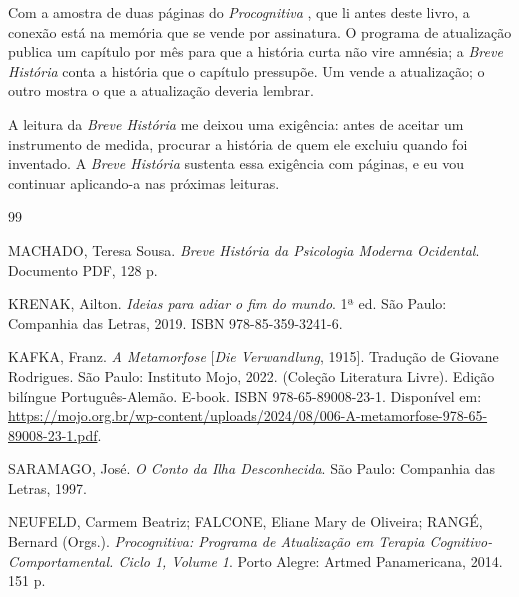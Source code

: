 \documentclass[12pt]{article}
\begin{document}
Com a amostra de duas páginas do \emph{Procognitiva} \cite{procognitiva2014}, que li antes deste livro, a conexão está na memória que se vende por assinatura. O programa de atualização publica um capítulo por mês para que a história curta não vire amnésia; a \emph{Breve História} conta a história que o capítulo pressupõe. Um vende a atualização; o outro mostra o que a atualização deveria lembrar.

A leitura da \emph{Breve História} me deixou uma exigência: antes de aceitar um instrumento de medida, procurar a história de quem ele excluiu quando foi inventado. A \emph{Breve História} sustenta essa exigência com páginas, e eu vou continuar aplicando-a nas próximas leituras.

\begin{thebibliography}{99}

MACHADO, Teresa Sousa.
\emph{Breve História da Psicologia Moderna Ocidental}.
Documento PDF, 128 p.

KRENAK, Ailton.
\emph{Ideias para adiar o fim do mundo}.
1ª ed. São Paulo: Companhia das Letras, 2019.
ISBN 978-85-359-3241-6.

KAFKA, Franz.
\emph{A Metamorfose} [\emph{Die Verwandlung}, 1915].
Tradução de Giovane Rodrigues.
São Paulo: Instituto Mojo, 2022. (Coleção Literatura Livre).
Edição bilíngue Português-Alemão. E-book.
ISBN 978-65-89008-23-1.
Disponível em: \url{https://mojo.org.br/wp-content/uploads/2024/08/006-A-metamorfose-978-65-89008-23-1.pdf}.

SARAMAGO, José.
\emph{O Conto da Ilha Desconhecida}.
São Paulo: Companhia das Letras, 1997.

NEUFELD, Carmem Beatriz; FALCONE, Eliane Mary de Oliveira; RANGÉ, Bernard (Orgs.).
\emph{Procognitiva: Programa de Atualização em Terapia Cognitivo-Comportamental. Ciclo 1, Volume 1}.
Porto Alegre: Artmed Panamericana, 2014. 151 p.

\end{thebibliography}
\end{document}
